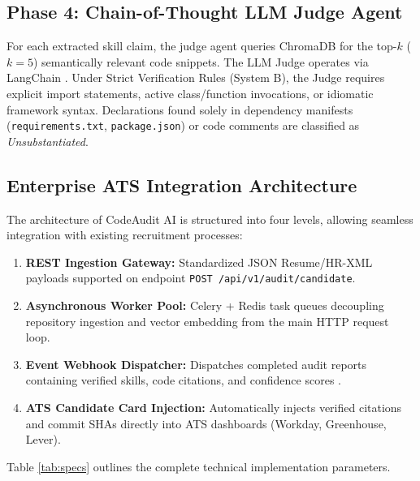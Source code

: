 \documentclass[conference]{IEEEtran}
\begin{document}
\subsection{Phase 4: Chain-of-Thought LLM Judge Agent}
For each extracted skill claim, the judge agent queries ChromaDB for the top-$k$ ($k=5$) semantically relevant code snippets. The LLM Judge operates via LangChain \cite{langchain2023}. Under Strict Verification Rules (System B), the Judge requires explicit import statements, active class/function invocations, or idiomatic framework syntax. Declarations found solely in dependency manifests (\texttt{requirements.txt}, \texttt{package.json}) or code comments are classified as \textit{Unsubstantiated}.

\subsection{Enterprise ATS Integration Architecture}
The architecture of CodeAudit AI is structured into four levels, allowing seamless integration with existing recruitment processes:
\begin{enumerate}
    \item \textbf{REST Ingestion Gateway:} Standardized JSON Resume/HR-XML payloads supported on endpoint \texttt{POST /api/v1/audit/candidate}.
    \item \textbf{Asynchronous Worker Pool:} Celery + Redis task queues decoupling repository ingestion and vector embedding from the main HTTP request loop.
    \item \textbf{Event Webhook Dispatcher:} Dispatches completed audit reports containing verified skills, code citations, and confidence scores \cite{jayaratne2022systematic}.
    \item \textbf{ATS Candidate Card Injection:} Automatically injects verified citations and commit SHAs directly into ATS dashboards (Workday, Greenhouse, Lever).
\end{enumerate}

Table \ref{tab:specs} outlines the complete technical implementation parameters.
\end{document}
